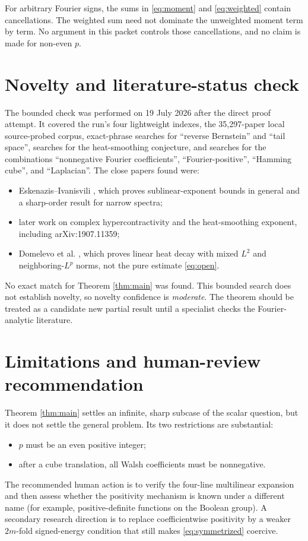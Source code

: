 \documentclass[11pt]{article}
\begin{document}
For arbitrary Fourier signs, the sums in \eqref{eq:moment} and
\eqref{eq:weighted} contain cancellations.  The weighted sum need not dominate
the unweighted moment term by term.  No argument in this packet controls those
cancellations, and no claim is made for non-even $p$.

\section{Novelty and literature-status check}

The bounded check was performed on 19 July 2026 after the direct proof attempt.
It covered the run's four lightweight indexes, the 35,297-paper local
source-probed corpus, exact-phrase searches for ``reverse Bernstein'' and
``tail space'', searches for the heat-smoothing conjecture, and searches for
the combinations ``nonnegative Fourier coefficients'', ``Fourier-positive'',
``Hamming cube'', and ``Laplacian''.  The close papers found were:
\begin{itemize}[leftmargin=*]
  \item Eskenazis--Ivanisvili \cite{EI}, which proves sublinear-exponent bounds
  in general and a sharp-order result for narrow spectra;
  \item later work on complex hypercontractivity and the heat-smoothing
  exponent, including arXiv:1907.11359;
  \item Domelevo et al. \cite{DDF}, which proves linear heat decay with mixed
  $L^2$ and neighboring-$L^p$ norms, not the pure estimate \eqref{eq:open}.
\end{itemize}
No exact match for Theorem \ref{thm:main} was found.  This bounded search does
not establish novelty, so novelty confidence is \emph{moderate}.  The theorem
should be treated as a candidate new partial result until a specialist checks
the Fourier-analytic literature.

\section{Limitations and human-review recommendation}

Theorem \ref{thm:main} settles an infinite, sharp subcase of the scalar
question, but it does not settle the general problem.  Its two restrictions
are substantial:
\begin{itemize}[leftmargin=*]
  \item $p$ must be an even positive integer;
  \item after a cube translation, all Walsh coefficients must be nonnegative.
\end{itemize}
The recommended human action is to verify the four-line multilinear expansion
and then assess whether the positivity mechanism is known under a different
name (for example, positive-definite functions on the Boolean group).  A
secondary research direction is to replace coefficientwise positivity by a
weaker $2m$-fold signed-energy condition that still makes
\eqref{eq:symmetrized} coercive.
\end{document}

